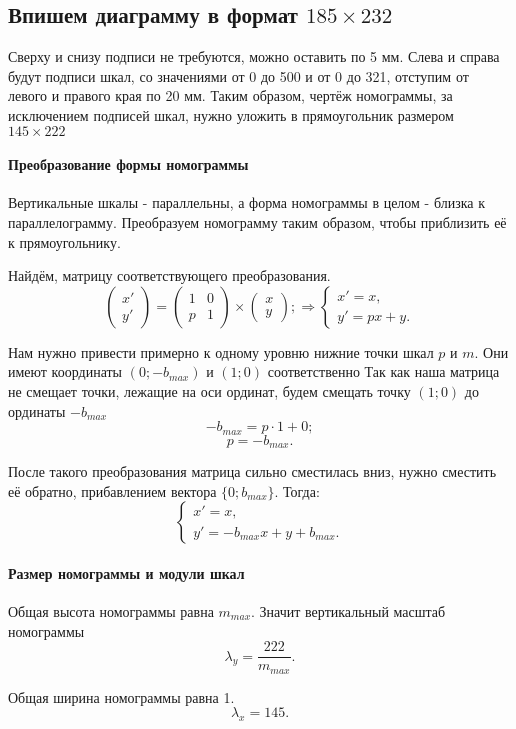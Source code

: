 \subsection{Впишем диаграмму в формат $185 \times 232$}

Сверху и снизу подписи не требуются, можно оставить по 5 мм.
Слева и справа будут подписи шкал, со значениями от 0 до 500 и от 0 до 321, отступим от левого и правого края по 20 мм.
Таким образом, чертёж номограммы, за исключением подписей шкал, нужно уложить в прямоугольник размером $145 \times 222$

\paragraph{Преобразование формы номограммы}
Вертикальные шкалы - параллельны, а форма номограммы в целом - близка к параллелограмму.
Преобразуем номограмму таким образом, чтобы приблизить её к прямоугольнику.

Найдём, матрицу соответствующего преобразования.
$$
\left(
	\begin{array}{c}
		x' \\
		y'
	\end{array}
\right) 
= 
\left(
	\begin{array}{cc}
		1 & 0 \\
		p & 1
	\end{array}
\right) 
\times 
\left(
	\begin{array}{c}
		x \\
		y
	\end{array}
\right)
;
\Rightarrow
\left\{
	\begin{array}{l}
		x' = x,\\
		y' = px + y.
	\end{array}
\right. 
$$

Нам нужно привести примерно к одному уровню нижние точки шкал $p$ и $m$. 
Они имеют координаты $(0; -b_{max})$ и $(1; 0)$ соответственно
Так как наша матрица не смещает точки, лежащие на оси ординат, будем смещать точку $(1; 0)$ до ординаты $-b_{max}$
$$-b_{max} = p \cdot 1 + 0;$$
$$p = -b_{max}.$$

После такого преобразования матрица сильно сместилась вниз, нужно сместить её обратно, прибавлением вектора $\{0; b_{max}\}$.
Тогда:
$$
\left\{
	\begin{array}{l}
		x' = x,\\
		y' = -b_{max}x + y + b_{max}.
	\end{array}
\right. 
$$

\paragraph{Размер номограммы и модули шкал}

Общая высота номограммы равна $m_{max}$.
Значит вертикальный масштаб номограммы
$$\lambda_y = \frac{222}{m_{max}}.$$

Общая ширина номограммы равна 1.
$$\lambda_x = 145.$$